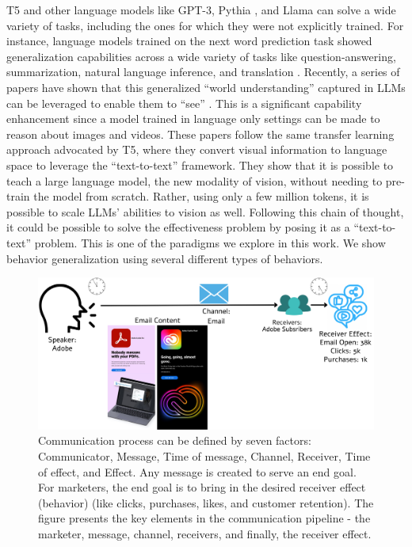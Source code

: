 T5 and other language models like GPT-3, Pythia \cite{biderman2023pythia}, and Llama \cite{touvron2023llama} can solve a wide variety of tasks, including the ones for which they were not explicitly trained. For instance, language models trained on the next word prediction task showed generalization capabilities across a wide variety of tasks like question-answering, summarization, natural language inference, and translation \cite{brown2020language}. Recently, a series of papers have shown that this generalized ``world understanding'' captured in LLMs can be leveraged to enable them to ``see'' \cite{liu2023visual,li2023videochat,li2023blip2,zhu2023minigpt,ge2023planting,zhang2023video,bhattacharya2023video}. This is a significant capability enhancement since a model trained in language only settings can be made to reason about images and videos. These papers follow the same transfer learning approach advocated by T5, where they convert visual information to language space to leverage the ``text-to-text'' framework. They show that it is possible to teach a large language model, the new modality of vision, without needing to pre-train the model from scratch. Rather, using only a few million tokens, it is possible to scale LLMs' abilities to vision as well. Following this chain of thought, it could be possible to solve the effectiveness problem by posing it as a ``text-to-text'' problem. This is one of the paradigms we explore in this work. We show behavior generalization using several different types of behaviors.

\begin{figure}[!t]
  \centering
  \includegraphics[width=1.0\textwidth]{images/factors of communication.pdf}
  \caption{Communication process can be defined by seven factors: Communicator, Message, Time of message, Channel, Receiver, Time of effect, and Effect. Any message is created to serve an end goal. For marketers, the end goal is to bring in the desired receiver effect (behavior) (like clicks, purchases, likes, and customer retention). The figure presents the key elements in the communication pipeline - the marketer, message, channel, receivers, and finally, the receiver effect. \label{fig:factors-of-communication-chapter-lcbm}}
\end{figure}


